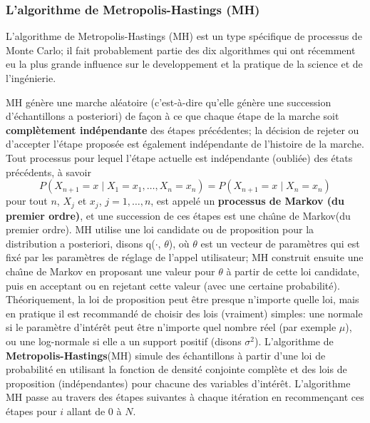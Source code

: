 \subsubsection*{L'algorithme de Metropolis-Hastings (MH)}
L'algorithme de Metropolis-Hastings (MH) est un type sp\'ecifique de processus de Monte Carlo; il fait probablement partie des dix algorithmes qui ont r\'ecemment eu la plus grande influence sur le developpement et la pratique de la science et de l'ing\'enierie. \par MH g\'en\`ere une marche al\'eatoire (c'est-\`a-dire qu'elle g\'en\`ere une succession d'\'echantillons a posteriori) de façon \`a ce que chaque \'etape de la marche soit \textbf{compl\`etement ind\'ependante} des \'etapes pr\'ec\'edentes; la d\'ecision de rejeter ou d'accepter l'\'etape propos\'ee est \'egalement ind\'ependante de l'histoire de la marche. \newl Tout processus pour lequel l'\'etape actuelle est ind\'ependante (oubli\'ee) des \'etats pr\'ec\'edents, \`a savoir
$$P(X_{n+1}=x\mid X_1=x_1,\ldots,X_n=x_n)=P(X_{n+1}=x\mid X_n=x_n)$$ pour tout $n$, $X_j$ et $x_j$, $j=1,\ldots, n$, est appel\'e un \textbf{processus de Markov (du premier ordre)}, et une succession de ces \'etapes est une cha\^{\i}ne de Markov(du premier ordre). \newl MH utilise une loi candidate ou de proposition pour la distribution a posteriori, disons q($\cdot$, $\theta$), où $\theta$ est un vecteur de param\`etres qui est fix\'e par les param\`etres de r\'eglage de l'appel utilisateur; MH construit ensuite une cha\^{\i}ne de Markov en proposant une valeur pour $\theta$ \`a partir de cette loi candidate, puis en acceptant ou en rejetant cette valeur (avec une certaine probabilit\'e). \newl Th\'eoriquement, la loi de proposition peut être presque n'importe quelle loi, mais en pratique il est recommand\'e de choisir des lois (vraiment) simples: une normale si le param\`etre d'int\'erêt peut être n'importe quel nombre r\'eel (par exemple $\mu$), ou une log-normale si elle a un support positif (disons $\sigma^{2}$). \newl
L'algorithme de \textbf{Metropolis-Hastings}(MH) simule des \'echantillons \`a partir d'une loi de probabilit\'e en utilisant la fonction de densit\'e conjointe compl\`ete et des lois de proposition (ind\'ependantes) pour chacune des variables d'int\'erêt.  L’algorithme MH passe au travers des \'etapes suivantes \`a chaque it\'eration en recommençant ces \'etapes pour $i$ allant de 0 \`a $N$.
